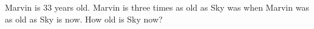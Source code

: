 Marvin is $33$ years old. Marvin is three times as old as Sky was when Marvin was as old as Sky is now. How old is Sky now?

